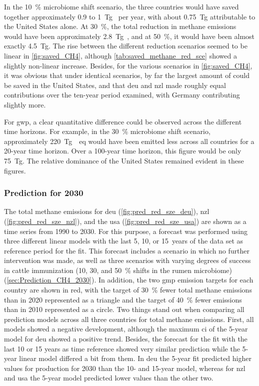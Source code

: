 In the 10~\% microbiome shift scenario, the three countries would have saved together approximately 0.9 to 1~Tg~ per year, with about 0.75~Tg attributable to the United States alone. At 30~\%, the total reduction in methane emissions would have been approximately 2.8~Tg~, and at 50~\%, it would have been almost exactly 4.5~Tg. The rise between the different reduction scenarios seemed to be linear in \cref{fig:saved_CH4}, although \cref{tab:saved_methane_red_sce} showed a slightly non-linear increase. Besides, for the various scenarios in \cref{fig:saved_CH4}, it was obvious that under identical scenarios, by far the largest amount of  could be saved in the United States, and that \acrshort{deu} and \acrshort{nzl} made roughly equal contributions over the ten-year period examined, with Germany contributing slightly more.

For \acrfull{gwp}, a clear quantitative difference could be observed across the different time horizons. For example, in the 30~\% microbiome shift scenario, approximately 220~Tg~~\acrshort{eq} would have been emitted less across all countries for a 20-year time horizon. Over a 100-year time horizon, this figure would be only 75~Tg. The relative dominance of the United States remained evident in these figures.


\subsubsection{Prediction for 2030}
\label{sec:prediction_2030}


The total methane emissions for \acrshort{deu} (\cref{fig:pred_red_sze_deu}), \acrshort{nzl} (\cref{fig:pred_red_sze_nzl}), and the \acrshort{usa} (\cref{fig:pred_red_sze_usa}) are shown as a time series from 1990 to 2030. For this purpose, a forecast was performed using three different linear models with the last 5, 10, or 15~years of the data set as reference period for the fit. This forecast includes a scenario in which no further intervention was made, as well as three scenarios with varying degrees of success in cattle immunization (10, 30, and 50~\% shifts in the rumen microbiome) (\cref{sec:Prediction_CH4_2030}).  In addition, the two \acrlong{gmp} emission targets for each country are shown in red, with the target of 30~\% fewer total methane emissions than in 2020 represented as a triangle and the target of 40~\% fewer emissions than in 2010 represented as a circle.
Two things stand out when comparing all prediction models across all three countries for total methane emissions.  
First, all models showed a negative development, although the maximum \acrfull{ci} of the 5-year model for \acrshort{deu} showed a positive trend. 
Besides, the forecast for the fit with the last 10 or 15 years as time reference showed very similar prediction while the 5-year linear model differed a bit from them. In \acrshort{deu} the 5-year fit predicted higher values for  production for 2030 than the 10- and 15-year model, whereas for \acrshort{nzl} and \acrshort{usa} the 5-year model predicted lower values than the other two. 

